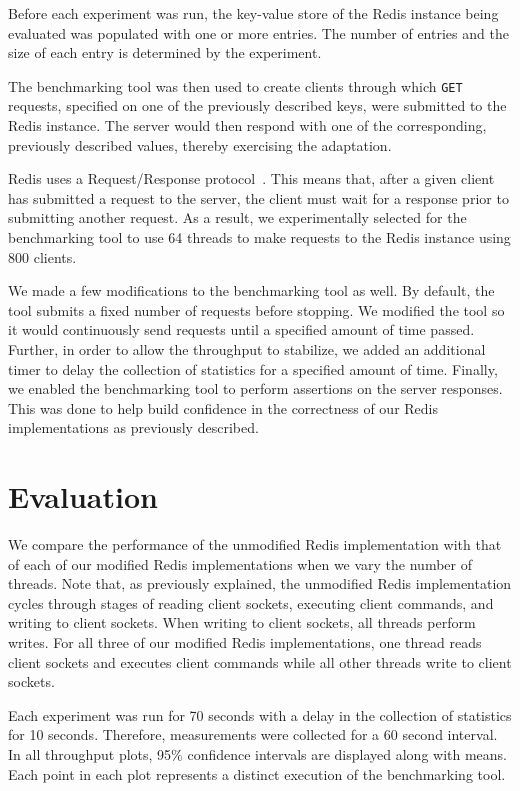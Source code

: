 \documentclass[sigconf, screen]{acmart}
\newcommand{\inlinecode}[1]{\texttt{#1}}
\begin{document}
Before each experiment was run, the key-value store of the Redis instance being evaluated was populated with one or more entries.
The number of entries and the size of each entry is determined by the experiment.

The benchmarking tool was then used to create clients through which \inlinecode{GET} requests, specified on one of the previously described keys, were submitted to the Redis instance.
The server would then respond with one of the corresponding, previously described values, thereby exercising the adaptation.

Redis uses a Request/Response protocol~\cite{redis-pipeline}.
This means that, after a given client has submitted a request to the server, the client must wait for a response prior to submitting another request.
As a result, we experimentally selected for the benchmarking tool to use 64 threads to make requests to the Redis instance using 800 clients.

We made a few modifications to the benchmarking tool as well.
By default, the tool submits a fixed number of requests before stopping.
We modified the tool so it would continuously send requests until a specified amount of time passed.
Further, in order to allow the throughput to stabilize, we added an additional timer to delay the collection of statistics for a specified amount of time.
Finally, we enabled the benchmarking tool to perform assertions on the server responses.
This was done to help build confidence in the correctness of our Redis implementations as previously described.


\section{Evaluation}
We compare the performance of the unmodified Redis implementation with that of each of our modified Redis implementations when we vary the number of threads.
Note that, as previously explained, the unmodified Redis implementation cycles through stages of reading client sockets, executing client commands, and writing to client sockets.
When writing to client sockets, all threads perform writes.
For all three of our modified Redis implementations, one thread reads client sockets and executes client commands while all other threads write to client sockets.

Each experiment was run for 70 seconds with a delay in the collection of statistics for 10 seconds.
Therefore, measurements were collected for a 60 second interval.
In all throughput plots, 95\% confidence intervals are displayed along with means.
Each point in each plot represents a distinct execution of the benchmarking tool.
\end{document}
